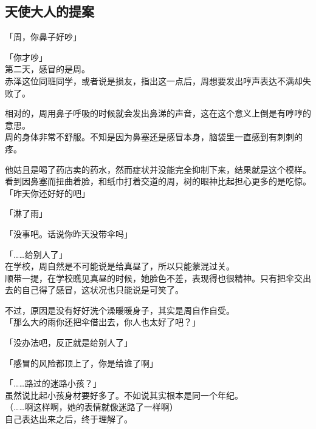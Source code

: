 \subsection{天使大人的提案}

「周，你鼻子好吵」

「你才吵」\\

第二天，感冒的是周。\\

赤泽这位同班同学，或者说是损友，指出这一点后，周想要发出哼声表达不满却失败了。

相对的，周用鼻子呼吸的时候就会发出鼻涕的声音，这在这个意义上倒是有哼哼的意思。\\

周的身体非常不舒服。不知是因为鼻塞还是感冒本身，脑袋里一直感到有刺刺的疼。

他姑且是喝了药店卖的药水，然而症状并没能完全抑制下来，结果就是这个模样。\\

看到因鼻塞而扭曲着脸，和纸巾打着交道的周，树的眼神比起担心更多的是吃惊。\\

「昨天你还好好的吧」

「淋了雨」

「没事吧。话说你昨天没带伞吗」

「……给别人了」\\

在学校，周自然是不可能说是给真昼了，所以只能蒙混过关。\\

顺带一提，在学校瞧见真昼的时候，她脸色不差，表现得也很精神。只有把伞交出去的自己得了感冒，这状况也只能说是可笑了。

不过，原因是没有好好洗个澡暖暖身子，其实是周自作自受。\\

「那么大的雨你还把伞借出去，你人也太好了吧？」

「没办法吧，反正就是给别人了」

「感冒的风险都顶上了，你是给谁了啊」

「……路过的迷路小孩？」\\

虽然说比起小孩身材要好多了。不如说其实根本是同一个年纪。\\

（……啊这样啊，她的表情就像迷路了一样啊）\\

自己表达出来之后，终于理解了。

